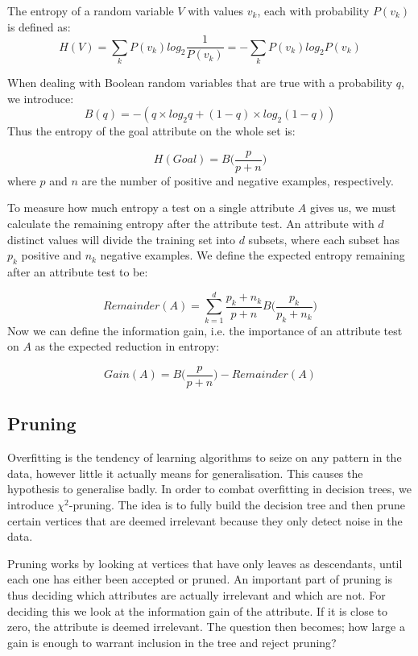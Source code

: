 \documentclass{article}
\begin{document}
The entropy of a random variable $V$ with values $v_k$, each with probability $P(v_k)$ is defined as:
\begin{displaymath}
H(V) = \sum_{k} P(v_k)log_2\frac{1}{P(v_k)} = -\sum_{k}P(v_k)log_2P(v_k)
\end{displaymath}

When dealing with Boolean random variables that are true with a probability $q$, we introduce:
\begin{displaymath}
B(q) = -(q\times log_2q+(1-q)\times log_2(1-q))
\end{displaymath}
Thus the entropy of the goal attribute on the whole set is:

\begin{displaymath}
H(Goal) = B\bigg(\frac{p}{p+n}\bigg)
\end{displaymath}
where $p$ and $n$ are the number of positive and negative examples, respectively.

To measure how much entropy a test on a single attribute $A$ gives us, we must calculate the remaining entropy after the attribute test. An attribute with $d$ distinct values will divide the training set into $d$ subsets, where each subset has $p_k$ positive and $n_k$ negative examples. We define the expected entropy remaining after an attribute test to be:

\begin{displaymath}
Remainder(A) = \sum_{k=1}^{d}\frac{p_k+n_k}{p+n}B\bigg(\frac{p_k}{p_k+n_k}\bigg)
\end{displaymath}
Now we can define the information gain, i.e. the importance of an attribute test on $A$ as the expected reduction in entropy:

\begin{displaymath}
Gain(A) = B\bigg(\frac{p}{p+n}\bigg) - Remainder(A)
\end{displaymath}

\subsection{Pruning}
Overfitting is the tendency of learning algorithms to seize on any pattern in the data, however little it actually means for generalisation. This causes the hypothesis to generalise badly. In order to combat overfitting in decision trees, we introduce $\chi^2$-pruning. The idea is to fully build the decision tree and then prune certain vertices that are deemed irrelevant because they only detect noise in the data.

Pruning works by looking at vertices that have only leaves as descendants, until each one has either been accepted or pruned. An important part of pruning is thus deciding which attributes are actually irrelevant and which are not. For deciding this we look at the information gain of the attribute. If it is close to zero, the attribute is deemed irrelevant. The question then becomes; how large a gain is enough to warrant inclusion in the tree and reject pruning?
\end{document}
